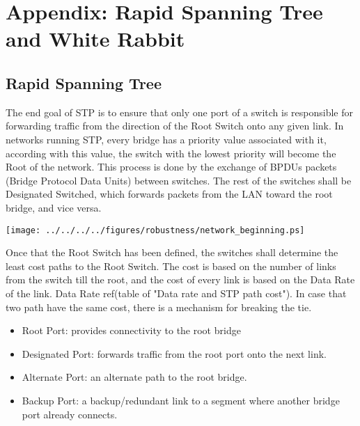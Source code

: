 \chapter{Appendix: Rapid Spanning Tree and White Rabbit}
\label{appD}

\section{Rapid Spanning Tree}

The end goal of STP is to ensure that only one port of a switch is responsible 
for forwarding traffic from the direction of the Root Switch onto any given
link. In networks running STP, every bridge has a priority value associated with
it, according with this value, the switch with the lowest priority will become
the Root of the network.  This process is done by the exchange of BPDUs packets
(Bridge Protocol Data Units) between switches. The rest of the switches shall be
Designated Switched, which forwards packets from the LAN toward the root bridge,
and vice versa.

\begin{center}
        \texttt{[image: ../../../../figures/robustness/network\_beginning.ps]}
        \label{fig:redunt_net}
\end{center}


Once that the Root Switch has been defined, the switches shall determine
the least cost paths to the Root Switch. The cost is based on the number of
links from the switch till the root, and the cost of every link is based on the
Data Rate of the link. Data Rate ref(table of "Data rate and STP path cost"). In
case that two path have the same cost, there is a mechanism for breaking the
tie.

\begin{itemize}
        \item Root Port: provides connectivity to the root bridge
        \item Designated Port: forwards traffic from the root port onto the
next link.
        \item Alternate Port: an alternate path to the root bridge.
        \item Backup Port: a backup/redundant link to a segment where
another bridge port already connects.
\end{itemize}


